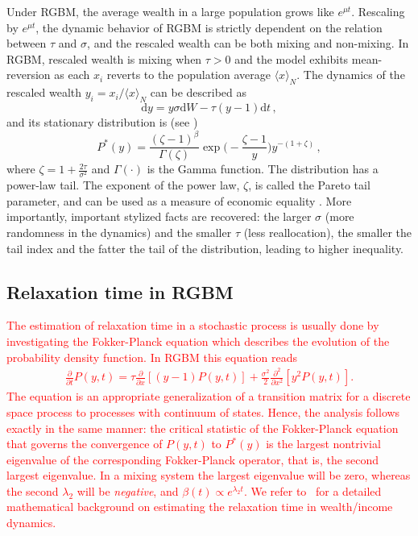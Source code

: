 \documentclass[11pt]{article}
\newcommand{\be}{\begin{equation}}
\newcommand{\ee}{\end{equation}}
\numberwithin{equation}{section}
\begin{document}
Under RGBM, the average wealth in a large population grows like $e^{\mu t}$. Rescaling by $e^{\mu t}$, the dynamic behavior of RGBM is strictly dependent on the relation between $\tau$ and $\sigma$, and the rescaled wealth can be both mixing and non-mixing. In RGBM, rescaled wealth is mixing when $\tau > 0$
and the model exhibits mean-reversion as each $x_i$ reverts to the population average $\langle x \rangle_N$. The dynamics of the rescaled wealth $y_i = x_i / \langle x \rangle_N$ can be described as
%
\be
    \mathrm{d} y =   y \sigma  \mathrm{d} W - \tau (y - 1)  \mathrm{d}t\,,
    \label{eq:rescaled-rgbm}
\ee
%
and its stationary distribution is (see \citep{BermanPetersAdamou2019})
%
\be
P^*(y) = \frac{(\zeta - 1)^{\beta}}{\Gamma(\zeta)} \exp{\big(-\frac{\zeta - 1}{y}\big)} y^{-(1+\zeta)}\,,
\label{eq:rgbm-stationary-distribution}
\ee
%
where $\zeta = 1 + \frac{2 \tau}{\sigma^2}$ and $\Gamma(\cdot)$ is the Gamma function. The distribution has a power-law tail. The exponent of the power law, $\zeta$, is called the Pareto tail parameter, and can be used as a measure of economic equality \citep{Cowell2011}. More importantly, important stylized facts are recovered: the larger $\sigma$ (more randomness in the dynamics) and the smaller $\tau$ (less reallocation), the smaller the tail index and the fatter the tail of the distribution, leading to higher inequality.

\subsection{Relaxation time in RGBM}
\label{sec:relax-time-rgbm}
\textcolor{red}{The estimation of relaxation time in a stochastic process is usually done by investigating the Fokker-Planck equation which describes the evolution of the probability density function. In RGBM this equation reads
\begin{align}
       \frac{\partial}{\partial t}P(y,t)= \tau \frac{\partial}{\partial x} \left[(y-1) P(y,t)\right] + \frac{\sigma^2}{2}\frac{\partial^2}{\partial x^2} \left[ y^2 P(y,t) \right].
\end{align}
The equation is an appropriate generalization of a transition matrix for a discrete space process to processes with continuum of states. Hence, the analysis follows exactly in the same manner: the critical statistic of the Fokker-Planck equation that governs the convergence of $P(y,t)$ to $P^*(y)$ is the largest nontrivial eigenvalue of the corresponding Fokker-Planck operator, that is, the second largest eigenvalue. In a mixing system the largest eigenvalue will be zero, whereas the second $\lambda_2$ will be \textit{negative}, and $\beta(t) \propto e^{\lambda_2 t}$. We refer to~\cite{gabaix2016dynamics} for a detailed mathematical background on estimating the relaxation time in wealth/income dynamics. }
\end{document}
